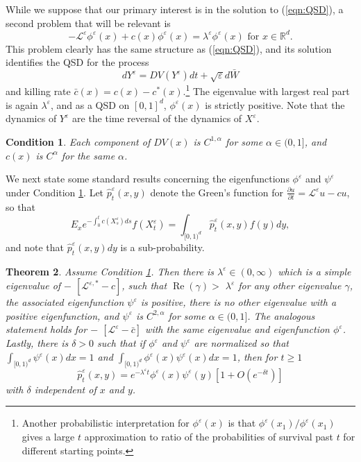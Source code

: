 \documentclass[english,11pt]{article}%
\newtheorem{theorem}{Theorem}
\newtheorem{condition}[theorem]{Condition}
\numberwithin{equation}{section}
\numberwithin{example}{section}
\numberwithin{theorem}{section}
\begin{document}
While we suppose that our primary interest is in the solution to
(\ref{eqn:QSD}), a second problem that will be relevant is
\begin{equation}
-\mathcal{L}^{\varepsilon}\phi^{\varepsilon}(x)+c(x)\phi^{\varepsilon
}(x)=\lambda^{\varepsilon}\phi^{\varepsilon}(x)\text{ for }x\in\mathbb{R}^{d}.
\label{eqn:QSDdual}%
\end{equation}
This problem clearly has the same structure as (\ref{eqn:QSD}), and its
solution identifies the QSD for the process
\begin{equation}
dY^{\varepsilon}=DV(Y^{\varepsilon})dt+\sqrt{\varepsilon}d\bar{W}
\label{eqn:SDEdual}%
\end{equation}
and killing rate $\bar{c}(x)=c(x)-c^{\ast}(x)$.\footnote{Another probabilistic
interpretation for $\phi^{\varepsilon}(x)$ is that $\phi^{\varepsilon}%
(x_{1})/\phi^{\varepsilon}(x_{1})$ gives a large $t$ approximation to ratio of
the probabilities of survival past $t$ for different starting points.} The
eigenvalue with largest real part is again $\lambda^{\varepsilon}$, and as a
QSD on $[0,1]^{d}$, $\phi^{\varepsilon}(x)$ is strictly positive. Note that
the dynamics of $Y^{\varepsilon}$ are the time reversal of the dynamics of
$X^{\varepsilon}$.

\begin{condition}
\label{con:reg}Each component of $DV(x)$ is $C^{1,\alpha}$ for some $\alpha
\in(0,1]$, and $c(x)$ is $C^{\alpha}$ for the same $\alpha$.
\end{condition}

We next state some standard results concerning the eigenfunctions
$\phi^{\varepsilon}$ and $\psi^{\varepsilon}$ under Condition \ref{con:reg}.
Let $\hat{p}_{t}^{\varepsilon}(x,y)$ denote the Green's function for
$\frac{\partial u}{\partial t}=\mathcal{L}^{\varepsilon}u-cu$, so that
\[
E_{x}e^{-\int_{0}^{t}c(X_{s}^{\varepsilon})ds}f(X_{t}^{\varepsilon}%
)=\int_{[0,1)^{d}}\hat{p}_{t}^{\varepsilon}(x,y)f(y)dy,
\]
and note that $\hat{p}_{t}^{\varepsilon}(x,y)dy$ is a sub-probability.

\begin{theorem}
Assume Condition \ref{con:reg}. Then there is $\lambda^{\varepsilon}%
\in(0,\infty)$ which is a simple eigenvalue of $-$ $[\mathcal{L}%
^{\varepsilon,\ast}-c]$, such that $\operatorname{Re}(\gamma)>$ $\lambda
^{\varepsilon}$ for any other eigenvalue $\gamma$, the associated
eigenfunction $\psi^{\varepsilon}$ is positive, there is no other eigenvalue
with a positive eigenfunction, and $\psi^{\varepsilon}$ is $C^{2,\alpha}$ for
some $\alpha\in(0,1]$. The analogous statement holds for $-$ $[\mathcal{L}%
^{\varepsilon}-\bar{c}]$ with the same eigenvalue and eigenfunction
$\phi^{\varepsilon}$. Lastly, there is $\delta>0$ such that if $\phi
^{\varepsilon}$ and $\psi^{\varepsilon}$ are normalized so that $\int
_{[0,1)^{d}}\psi^{\varepsilon}(x)dx=1$ and $\int_{[0,1)^{d}}\phi^{\varepsilon
}(x)\psi^{\varepsilon}(x)dx=1$, then for $t\geq1$
\[
\hat{p}_{t}^{\varepsilon}(x,y)=e^{-\lambda^{\varepsilon}t}\phi^{\varepsilon
}(x)\psi^{\varepsilon}(y)\left[  1+O(e^{-\delta t})\right]
\]
with $\delta$ independent of $x$ and $y$.
\end{theorem}
\end{document}
